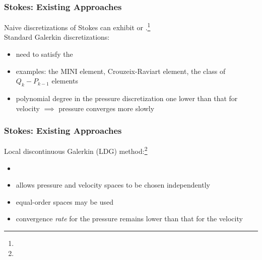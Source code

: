 \documentclass[mathserif]{beamer}
\newcommand{\pecosbold}[1]{{\color{pecos2}{#1}}}
\newcommand{\FootSize}{\scriptsize}
\begin{document}
\begin{frame}
\frametitle{Stokes: Existing Approaches}

Naive discretizations of Stokes can exhibit \pecosbold{non-convergence} or \pecosbold{locking}.\footnote{\FootSize {}}
\\
\vspace{5mm}
Standard Galerkin discretizations:
\begin{itemize}
\item need to satisfy the \pecosbold{LBB condition}
\item examples: the MINI element, Crouzeix-Raviart element, the class of $Q_{k}-P_{k-1}$ elements
\item polynomial degree in the pressure discretization one lower than that for velocity $\implies$ pressure converges more slowly
\end{itemize}


\end{frame}

\begin{frame}
\frametitle{Stokes: Existing Approaches}
Local discontinuous Galerkin (LDG) method:\footnote{\FootSize {}}
\begin{itemize}
\item \pecosbold{locally conservative}
\item allows pressure and velocity spaces to be chosen independently
\item equal-order spaces may be used
\item convergence \emph{rate} for the pressure remains lower than that for the velocity
\end{itemize}
\end{frame}
\end{document}
